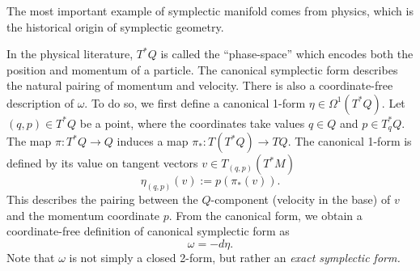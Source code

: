 



The most important example of symplectic manifold comes from physics, which is the historical origin of symplectic geometry. 

In the physical literature, $T^*Q$ is called the ``phase-space'' which encodes both the position and momentum of a particle.
The canonical symplectic form describes the natural pairing of momentum and velocity.
There is also a coordinate-free description of $\omega$.
 To do so, we first define a canonical 1-form  $\eta\in \Omega^1(T^*Q)$.
Let $(q,p)\in T^*Q$ be a point, where the coordinates take values $q\in Q$ and $p\in T^*_qQ$.
The map $\pi: T^*Q\to Q$ induces a map $\pi_*: T(T^*Q)\to TQ$. 
The canonical 1-form is defined by its value on tangent vectors  $v\in T_{(q,p)}(T^*M)$
\[\eta_{(q,p)}(v):=p(\pi_*(v)).\]
This describes the pairing between the $Q$-component (velocity in the base) of $v$  and the momentum coordinate $p$. 
From the canonical form, we obtain a coordinate-free definition of canonical symplectic form as 
\[\omega=-d\eta.\] 
Note that $\omega$ is not simply a closed 2-form, but rather an \emph{exact symplectic form. }  

